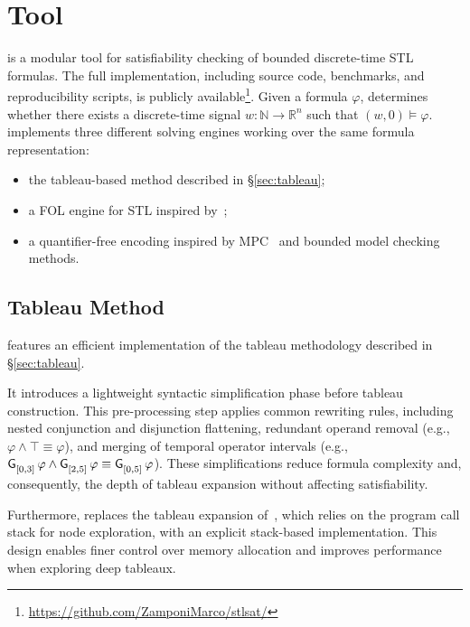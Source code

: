 \documentclass{easychair}
\begin{document}
\section{\stlsat{} Tool}
\label{sec:tool}

\stlsat{} is a modular tool for satisfiability checking of bounded discrete-time STL formulas.
%
The full implementation, including source code, benchmarks, and reproducibility scripts, is publicly available\footnote{\url{https://github.com/ZamponiMarco/stlsat/}}.
%
Given a formula $\varphi$, \stlsat{} determines whether there exists a discrete-time signal $w: \mathbb{N} \to \mathbb{R}^n$ such that $(w, 0) \models \varphi$. 
%
\stlsat{} implements three different solving engines working over the same formula representation:
\begin{itemize}[nosep]
    \item the tableau-based method described in \S\ref{sec:tableau};
    \item a FOL engine for STL inspired by~\cite{LiVR22};
    \item a quantifier-free encoding inspired by MPC~\cite{RamanDMMSS14} and bounded model checking~\cite{ClarkeBRZ01} methods.
\end{itemize}

\subsection{Tableau Method}

\stlsat{} features an efficient implementation of the tableau methodology described in \S\ref{sec:tableau}. 

It introduces a lightweight syntactic simplification phase before tableau construction. This pre-processing step applies common rewriting rules, including nested conjunction and disjunction flattening, redundant operand removal (e.g., $\varphi \land \top \equiv \varphi$), and merging of temporal operator intervals (e.g., $\mathop{\mathsf{\mathsf{G}}^{{}}_{[0,3]}}\varphi \land \mathop{\mathsf{\mathsf{G}}^{{}}_{[2,5]}}\varphi \equiv \mathop{\mathsf{\mathsf{G}}^{{}}_{[0,5]}}\varphi$). These simplifications reduce formula complexity and, consequently, the depth of tableau expansion without affecting satisfiability.

Furthermore, \stlsat{} replaces the tableau expansion of~\cite{MelaniBC25}, which relies on the program call stack for node exploration, with an explicit stack-based implementation. This design enables finer control over memory allocation and improves performance when exploring deep tableaux.
\end{document}
